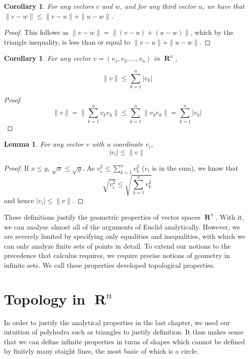 \documentclass{report}
\newtheorem{lemma}[theorem]{Lemma}
\newtheorem{corollary}[theorem]{Corollary}
\DeclareMathOperator{\real}{\mathbf{R}}
\begin{document}
\begin{corollary}
  For any vectors $v$ and $w$, and for any third vector $u$, we have that $\|v - w\| \leq \|v - u\| + \|u - w\|$.
\end{corollary}
\begin{proof}
  This follows as $\| v - w \| = \| (v - u) + (u - w) \|$, which by the triangle inequality, is less than or equal to $\| v - u \| + \| u - w \|$.
\end{proof}

\begin{corollary}
  For any vector $v = (v_1, v_2, \dots, v_n)$ in $\real^n$,

  \[ \|v\| \leq \sum_{k = 1}^n |v_k| \]
\end{corollary}
\begin{proof}
  \[ \| v \| = \| \sum_{k = 1}^n v_k e_k \| \leq \sum_{k = 1}^n \| v_k e_k \| = \sum_{k = 1}^n | v_k | \]
\end{proof}

\begin{lemma}
  For any vector $v$ with a coordinate $v_i$,
  \[ |v_i| \leq \| v \| \]
\end{lemma}
\begin{proof}
  If $x \leq y$, $\sqrt{x} \leq \sqrt{y}$. As $v_i^2 \leq \sum_{k=1}^n v_k^2$ ($v_i$ is in the sum), we know that
  \[ \sqrt{v_i^2} \leq \sqrt{\sum_{k=1}^n v_k^2} \]
  and hence $|v_i| \leq \| v \|$.
\end{proof}

These definitions justify the geometric properties of vector spaces $\real^n$. With it, we can analyse almost all of the arguments of Euclid analytically. However, we are severely limited by specifying only equalities and inequalities, with which we can only analyze finite sets of points in detail. To extend our notions to the precedence that calculus requires, we require precise notions of geometry in infinite sets. We call these properties developed topological properties.










\chapter{Topology in $\real^n$}

In order to justify the analytical properties in the last chapter, we used our intuition of polyhedra such as triangles to justify definition. It thus makes sense that we can define infinite properties in turns of shapes which cannot be defined by finitely many staight lines, the most basic of which is a circle.
\end{document}
